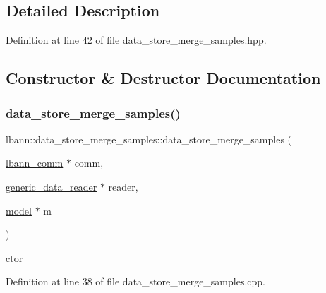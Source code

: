 \subsection{Detailed Description}


Definition at line 42 of file data\+\_\+store\+\_\+merge\+\_\+samples.\+hpp.



\subsection{Constructor \& Destructor Documentation}
\mbox{\label{classlbann_1_1data__store__merge__samples_ada5d181e33c9d9fe69979856b7f26268}} 
\subsubsection{\texorpdfstring{data\+\_\+store\+\_\+merge\+\_\+samples()}{data\_store\_merge\_samples()}\hspace{0.1cm}{\footnotesize\ttfamily [1/2]}}
{\footnotesize\ttfamily lbann\+::data\+\_\+store\+\_\+merge\+\_\+samples\+::data\+\_\+store\+\_\+merge\+\_\+samples (\begin{DoxyParamCaption}\item[{\hyperlink{classlbann_1_1lbann__comm}{lbann\+\_\+comm} $\ast$}]{comm,  }\item[{\hyperlink{classlbann_1_1generic__data__reader}{generic\+\_\+data\+\_\+reader} $\ast$}]{reader,  }\item[{\hyperlink{classlbann_1_1model}{model} $\ast$}]{m }\end{DoxyParamCaption})}



ctor 



Definition at line 38 of file data\+\_\+store\+\_\+merge\+\_\+samples.\+cpp.


